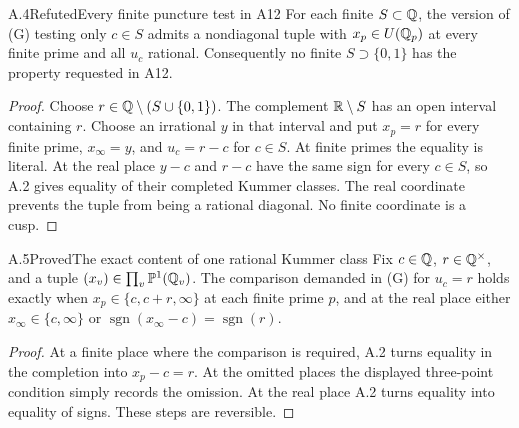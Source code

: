\begin{statement}{A.4}{Refuted}{Every finite puncture test in A12}
For each finite $S\subset\mathbb Q$, the version of (G) testing only $c\in S$
admits a nondiagonal tuple with $x_p\in U(\mathbb Q_p)$ at every finite prime
and all $u_c$ rational. Consequently no finite $S\supset\{0,1\}$
has the property requested in A12.
\end{statement}
\begin{proof}
Choose $r\in\mathbb Q\setminus(S\cup\{0,1\})$. The complement
$\mathbb R\setminus S$ has an open interval containing $r$. Choose an
irrational $y$ in that interval and put $x_p=r$ for every finite prime,
$x_\infty=y$, and $u_c=r-c$ for $c\in S$.
At finite primes the equality is literal. At the real place $y-c$
and $r-c$ have the same sign for every $c\in S$, so A.2 gives equality
of their completed Kummer classes. The real coordinate prevents the
tuple from being a rational diagonal. No finite coordinate is a cusp.
\end{proof}

\begin{statement}{A.5}{Proved}{The exact content of one rational Kummer class}
Fix $c\in\mathbb Q$, $r\in\mathbb Q^\times$, and a tuple $(x_v)\in\prod_v\mathbb P^1(\mathbb Q_v)$.
The comparison demanded in (G) for $u_c=r$ holds exactly when
$x_p\in\{c,c+r,\infty\}$ at each finite prime $p$, and at the real
place either $x_\infty\in\{c,\infty\}$ or
$\operatorname{sgn}(x_\infty-c)=\operatorname{sgn}(r)$.
\end{statement}
\begin{proof}
At a finite place where the comparison is required, A.2 turns equality
in the completion into $x_p-c=r$. At the omitted places the displayed
three-point condition simply records the omission. At the real place
A.2 turns equality into equality of signs. These steps are reversible.
\end{proof}


